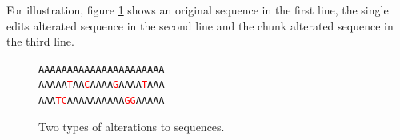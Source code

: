 For illustration, figure \ref{fig:alterations} shows an original sequence in
the first line, the single edits alterated sequence in the second line and the
chunk alterated sequence in the third line.

\newcommand{\tc}[1]{\textcolor{red}{#1}}
\begin{figure}[H]
  \centering
  \texttt{AAAAAAAAAAAAAAAAAAAAAA} \\
  \texttt{AAAAA\tc{T}AA\tc{C}AAAA\tc{G}AAAA\tc{T}AAA} \\
  \texttt{AAA\tc{TC}AAAAAAAAAA\tc{GG}AAAAA}
  \caption{Two types of alterations to sequences.}
  \label{fig:alterations}
\end{figure}
